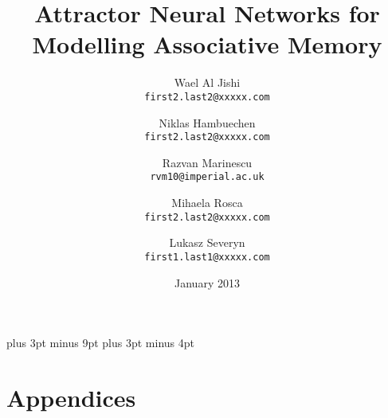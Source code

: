 \documentclass[11pt,a4paper,oneside]{report}
\title{Attractor Neural Networks for Modelling Associative Memory}
\date{January 2013}
\author{
  Wael Al Jishi\\
  \texttt{first2.last2@xxxxx.com}
  \and
  Niklas Hambuechen\\
  \texttt{first2.last2@xxxxx.com}
  \and
  Razvan Marinescu\\
  \texttt{rvm10@imperial.ac.uk}
  \and
  Mihaela Rosca\\
  \texttt{first2.last2@xxxxx.com}
  \and
  Lukasz Severyn\\
  \texttt{first1.last1@xxxxx.com}
}
\begin{document}
\belowdisplayskip=12pt plus 3pt minus 9pt
\belowdisplayshortskip=7pt plus 3pt minus 4pt







\maketitle{}


\renewcommand{\abstractname}{Executive Summary}



\tableofcontents

















\nocite{*} %





\chapter{Appendices}
\end{document}
